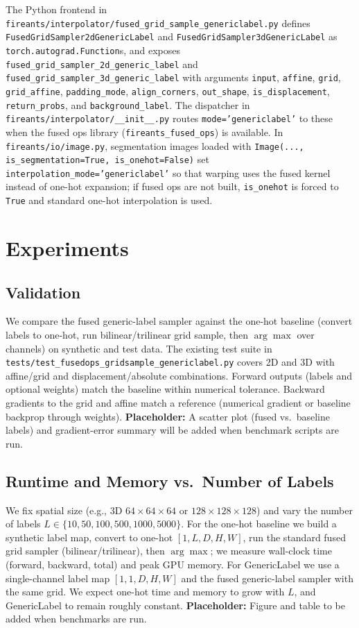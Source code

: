 \documentclass[11pt]{article}
\begin{document}
The Python frontend in \texttt{fireants/interpolator/fused\_grid\_sample\_genericlabel.py} defines \texttt{FusedGridSampler2dGenericLabel} and \texttt{FusedGridSampler3dGenericLabel} as \texttt{torch.autograd.Function}s, and exposes \texttt{fused\_grid\_sampler\_2d\_generic\_label} and \texttt{fused\_grid\_sampler\_3d\_generic\_label} with arguments \texttt{input}, \texttt{affine}, \texttt{grid}, \texttt{grid\_affine}, \texttt{padding\_mode}, \texttt{align\_corners}, \texttt{out\_shape}, \texttt{is\_displacement}, \texttt{return\_probs}, and \texttt{background\_label}. The dispatcher in \texttt{fireants/interpolator/\_\_init\_\_.py} routes \texttt{mode='genericlabel'} to these when the fused ops library (\texttt{fireants\_fused\_ops}) is available. In \texttt{fireants/io/image.py}, segmentation images loaded with \texttt{Image(..., is\_segmentation=True, is\_onehot=False)} set \texttt{interpolation\_mode='genericlabel'} so that warping uses the fused kernel instead of one-hot expansion; if fused ops are not built, \texttt{is\_onehot} is forced to \texttt{True} and standard one-hot interpolation is used.

\section{Experiments}
\label{sec:experiments}

\subsection{Validation}
We compare the fused generic-label sampler against the one-hot baseline (convert labels to one-hot, run bilinear/trilinear grid sample, then $\arg\max$ over channels) on synthetic and test data. The existing test suite in \texttt{tests/test\_fusedops\_gridsample\_genericlabel.py} covers 2D and 3D with affine/grid and displacement/absolute combinations. Forward outputs (labels and optional weights) match the baseline within numerical tolerance. Backward gradients to the grid and affine match a reference (numerical gradient or baseline backprop through weights). \textbf{Placeholder:} A scatter plot (fused vs.\ baseline labels) and gradient-error summary will be added when benchmark scripts are run.

\subsection{Runtime and Memory vs.\ Number of Labels}
We fix spatial size (e.g., 3D $64\times64\times64$ or $128\times128\times128$) and vary the number of labels $L \in \{10, 50, 100, 500, 1000, 5000\}$. For the one-hot baseline we build a synthetic label map, convert to one-hot $[1,L,D,H,W]$, run the standard fused grid sampler (bilinear/trilinear), then $\arg\max$; we measure wall-clock time (forward, backward, total) and peak GPU memory. For GenericLabel we use a single-channel label map $[1,1,D,H,W]$ and the fused generic-label sampler with the same grid. We expect one-hot time and memory to grow with $L$, and GenericLabel to remain roughly constant. \textbf{Placeholder:} Figure and table to be added when benchmarks are run.
\end{document}
